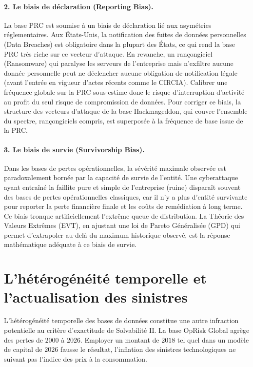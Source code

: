 \paragraph{2. Le biais de déclaration (Reporting Bias).}
La base PRC est soumise à un biais de déclaration lié aux asymétries réglementaires. Aux États-Unis, la notification des fuites de données personnelles (Data Breaches) est obligatoire dans la plupart des États, ce qui rend la base PRC très riche sur ce vecteur d'attaque. En revanche, un rançongiciel (Ransomware) qui paralyse les serveurs de l'entreprise mais n'exfiltre aucune donnée personnelle peut ne déclencher aucune obligation de notification légale (avant l'entrée en vigueur d'actes récents comme le CIRCIA).
Calibrer une fréquence globale sur la PRC sous-estime donc le risque d'interruption
d'activité au profit du seul risque de compromission de données. Pour corriger ce biais, la
structure des vecteurs d'attaque de la base Hackmageddon, qui couvre l'ensemble du spectre,
rançongiciels compris, est superposée à la fréquence de base issue de la PRC.

\paragraph{3. Le biais de survie (Survivorship Bias).}
Dans les bases de pertes opérationnelles, la sévérité maximale observée est paradoxalement bornée par la capacité de survie de l'entité. Une cyberattaque ayant entraîné la faillite pure et simple de l'entreprise (ruine) disparaît souvent des bases de pertes opérationnelles classiques, car il n'y a plus d'entité survivante pour reporter la perte financière finale et les coûts de remédiation à long terme. Ce biais tronque artificiellement l'extrême queue de distribution. La Théorie des Valeurs Extrêmes (EVT), en ajustant une loi de Pareto Généralisée (GPD) qui permet d'extrapoler au-delà du maximum historique observé, est la réponse mathématique adéquate à ce biais de survie.



\section{L'hétérogénéité temporelle et l'actualisation des sinistres}

L'hétérogénéité temporelle des bases de données constitue une autre infraction potentielle au critère d'exactitude de Solvabilité II. La base OpRisk Global agrège des pertes de $2000$ à $2026$. Employer un montant de $2018$ tel
quel dans un modèle de capital de $2026$ fausse le résultat, l'inflation des sinistres
technologiques ne suivant pas l'indice des prix à la consommation.

